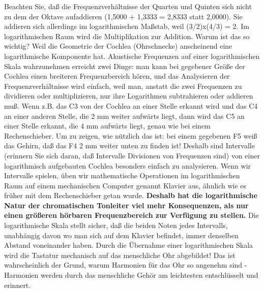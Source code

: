 Beachten Sie, daß die Frequenzverhältnisse der Quarten und Quinten sich nicht zu dem der Oktave aufaddieren (1,5000 + 1,3333 = 2,8333 statt 2,0000).
Sie addieren sich allerdings im logarithmischen Maßstab, weil (3/2)x(4/3) = 2.
Im logarithmischen Raum wird die Multiplikation zur Addition.
Warum ist das so wichtig?
Weil die Geometrie der Cochlea (Ohrschnecke) anscheinend eine logarithmische Komponente hat.
Akustische Frequenzen auf einer logarithmischen Skala wahrzunehmen erreicht zwei Dinge: man kann bei gegebener Größe der Cochlea einen breiteren Frequenzbereich hören, und das Analysieren der Frequenzverhältnisse wird einfach, weil man, anstatt die zwei Frequenzen zu dividieren oder multiplizieren, nur ihre Logarithmen subtrahieren oder addieren muß.
Wenn z.B. das C3 von der Cochlea an einer Stelle erkannt wird und das C4 an einer anderen Stelle, die 2 mm weiter aufwärts liegt, dann wird das C5 an einer Stelle erkannt, die 4 mm aufwärts liegt, genau wie bei einem Rechenschieber.
Um zu zeigen, wie nützlich das ist: bei einem gegebenen F5 weiß das Gehirn, daß das F4 2 mm weiter unten zu finden ist!
Deshalb sind Intervalle (erinnern Sie sich daran, daß Intervalle Divisionen von Frequenzen sind) von einer logarithmisch aufgebauten Cochlea besonders einfach zu analysieren.
Wenn wir Intervalle spielen, üben wir mathematische Operationen im logarithmischen Raum auf einem mechanischen Computer genannt Klavier aus, ähnlich wie es früher mit dem Rechenschieber getan wurde.
\textbf{Deshalb hat die logarithmische Natur der chromatischen Tonleiter viel mehr Konsequenzen, als nur einen größeren hörbaren Frequenzbereich zur Verfügung zu stellen.}
Die logarithmische Skala stellt sicher, daß die beiden Noten jedes Intervalls, unabhängig davon wo man sich auf dem Klavier befindet, immer denselben Abstand voneinander haben.
Durch die Übernahme einer logarithmischen Skala wird die Tastatur mechanisch auf das menschliche Ohr abgebildet!
Das ist wahrscheinlich der Grund, warum Harmonien für das Ohr so angenehm sind - Harmonien werden durch das menschliche Gehör am leichtesten entschlüsselt und erinnert.

